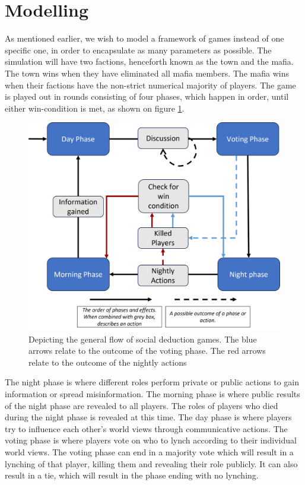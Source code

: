 \section{Modelling} \label{sec:Modelling}
As mentioned earlier, we wish to model a framework of games instead of one
specific one, in order to encapsulate as many parameters as possible. The
simulation will have two factions, henceforth known as the town and the mafia.
The town wins when they have eliminated all mafia members. The mafia wins when
their factions have the non-strict numerical majority of players. The game is
played out in rounds consisting of four phases, which happen in order, until
either win-condition is met, as shown on figure \ref{fig:GameOverview}.
\begin{figure}[H]
	\includegraphics[width=1\linewidth]{figures/Game_overview3}
	\caption{Depicting the general flow of social deduction games. The blue arrows relate to the outcome of the voting phase. The red arrows relate to the outcome of the nightly actions}
	\label{fig:GameOverview}
\end{figure}

The night phase is where different roles perform private or public actions to
gain information or spread misinformation. The morning phase is where public
results of the night phase are revealed to all players. The roles of players
who died during the night phase is revealed at this time. The day phase is
where players try to influence each other's world views through communicative
actions. The voting phase is where players vote on who to lynch according to
their individual world views. The voting phase can end in a majority vote which
will result in a lynching of that player, killing them and revealing their role
publicly. It can also result in a tie, which will result in the phase ending
with no lynching.

